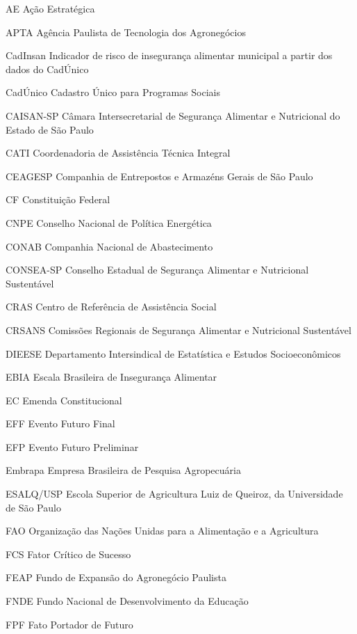 \documentclass[
	12pt,				%
	openright,			%
	oneside,			%
	a4paper,			%
	chapter=TITLE,		%
	section=TITLE,		%
	english,			%
	french,				%
	spanish,			%
	brazil,				%
 ]{abntex2}
\begin{document}
\begin{siglas}
	\item[AE] Ação Estratégica
	\item[APTA] Agência Paulista de Tecnologia dos Agronegócios
	\item[CadInsan] Indicador de risco de insegurança alimentar municipal a partir dos dados do CadÚnico
	\item[CadÚnico] Cadastro Único para Programas Sociais
	\item[CAISAN-SP] Câmara Intersecretarial de Segurança Alimentar e Nutricional do Estado de São Paulo
	\item[CATI] Coordenadoria de Assistência Técnica Integral
	\item[CEAGESP] Companhia de Entrepostos e Armazéns Gerais de São Paulo
	\item[CF] Constituição Federal
	\item[CNPE] Conselho Nacional de Política Energética
	\item[CONAB] Companhia Nacional de Abastecimento
	\item[CONSEA-SP] Conselho Estadual de Segurança Alimentar e Nutricional Sustentável
	\item[CRAS] Centro de Referência de Assistência Social
	\item[CRSANS] Comissões Regionais de Segurança Alimentar e Nutricional Sustentável
	\item[DIEESE] Departamento Intersindical de Estatística e Estudos Socioeconômicos
	\item[EBIA] Escala Brasileira de Insegurança Alimentar
	\item[EC] Emenda Constitucional
	\item[EFF] Evento Futuro Final
	\item[EFP] Evento Futuro Preliminar
	\item[Embrapa] Empresa Brasileira de Pesquisa Agropecuária
	\item[ESALQ/USP] Escola Superior de Agricultura Luiz de Queiroz, da Universidade de São Paulo
	\item[FAO] Organização das Nações Unidas para a Alimentação e a Agricultura
	\item[FCS] Fator Crítico de Sucesso
	\item[FEAP] Fundo de Expansão do Agronegócio Paulista
	\item[FNDE] Fundo Nacional de Desenvolvimento da Educação
	\item[FPF] Fato Portador de Futuro

\end{siglas}
\end{document}

